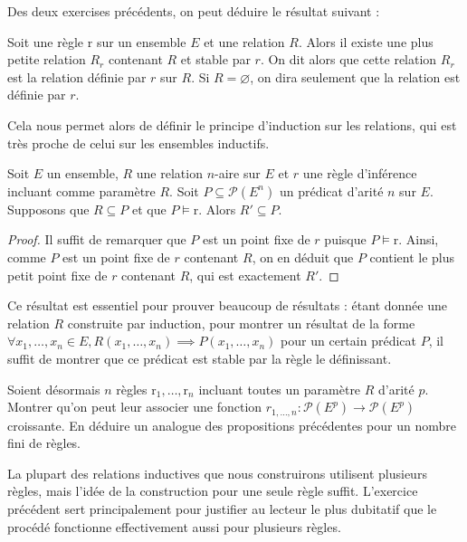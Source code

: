 Des deux exercises précédents, on peut déduire le résultat suivant :

\begin{corollary}
  Soit une règle $\mathrm r$ sur un ensemble $E$ et une relation $R$. Alors il
  existe une plus petite relation $R_r$ contenant $R$ et stable par $r$. On dit
  alors que cette relation $R_r$ est la relation définie par $r$ sur $R$. Si
  $R = \varnothing$, on dira seulement que la relation est définie par $r$.
\end{corollary}

Cela nous permet alors de définir le principe d'induction sur les relations,
qui est très proche de celui sur les ensembles inductifs.

\begin{theorem}
  Soit $E$ un ensemble, $R$ une relation $n$-aire sur $E$ et $r$ une règle
  d'inférence incluant comme paramètre $R$. Soit $P \subseteq \mathcal P(E^n)$
  un prédicat d'arité $n$ sur $E$. Supposons que $R\subseteq P$ et que
  $P\models \mathrm r$. Alors $R'\subseteq P$.
\end{theorem}

\begin{proof}
  Il suffit de remarquer que $P$ est un point fixe de $r$ puisque
  $P\models \mathrm r$. Ainsi, comme $P$ est un point fixe de $r$ contenant
  $R$, on en déduit que $P$ contient le plus petit point fixe de $r$ contenant
  $R$, qui est exactement $R'$.
\end{proof}

Ce résultat est essentiel pour prouver beaucoup de résultats : étant donnée une
relation $R$ construite par induction, pour montrer un résultat de la forme
$\forall x_1,\ldots,x_n\in E, R(x_1,\ldots,x_n)\implies P(x_1,\ldots,x_n)$ pour
un certain prédicat $P$, il suffit de montrer que ce prédicat est stable par
la règle le définissant.

\begin{exercise}
  Soient désormais $n$ règles $\mathrm r_1,\ldots,\mathrm r_n$ incluant toutes
  un paramètre $R$ d'arité $p$. Montrer qu'on peut leur associer une fonction
  $r_{1,\ldots,n} : \mathcal P(E^p) \to \mathcal P(E^p)$ croissante. En déduire
  un analogue des propositions précédentes pour un nombre fini de règles.
\end{exercise}

\begin{remark}
  La plupart des relations inductives que nous construirons utilisent plusieurs
  règles, mais l'idée de la construction pour une seule règle suffit. L'exercice
  précédent sert principalement pour justifier au lecteur le plus dubitatif que
  le procédé fonctionne effectivement aussi pour plusieurs règles.
\end{remark}


